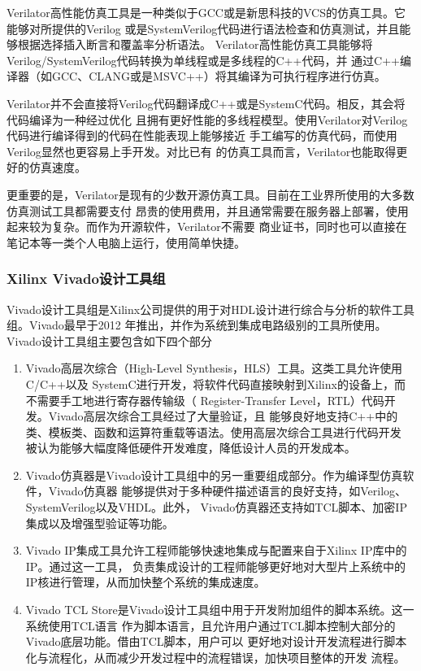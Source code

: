 Verilator高性能仿真工具是一种类似于GCC或是新思科技的VCS的仿真工具。它能够对所提供的Verilog
或是SystemVerilog代码进行语法检查和仿真测试，并且能够根据选择插入断言和覆盖率分析语法。
Verilator高性能仿真工具能够将Verilog/SystemVerilog代码转换为单线程或是多线程的C++代码，并
通过C++编译器（如GCC、CLANG或是MSVC++）将其编译为可执行程序进行仿真\cite{verilator_website}。

Verilator并不会直接将Verilog代码翻译成C++或是SystemC代码。相反，其会将代码编译为一种经过优化
且拥有更好性能的多线程模型。使用Verilator对Verilog代码进行编译得到的代码在性能表现上能够接近
手工编写的仿真代码\cite{snyder2017verilator}，而使用Verilog显然也更容易上手开发。对比已有
的仿真工具而言，Verilator也能取得更好的仿真速度\cite{snyder2013verilator}。

更重要的是，Verilator是现有的少数开源仿真工具。目前在工业界所使用的大多数仿真测试工具都需要支付
昂贵的使用费用，并且通常需要在服务器上部署，使用起来较为复杂。而作为开源软件，Verilator不需要
商业证书，同时也可以直接在笔记本等一类个人电脑上运行，使用简单快捷。

\subsubsection{Xilinx Vivado设计工具组}

Vivado设计工具组是Xilinx公司提供的用于对HDL设计进行综合与分析的软件工具组。Vivado最早于2012
年推出，并作为系统到集成电路级别的工具所使用。Vivado设计工具组主要包含如下四个部分

\begin{enumerate}
  \item Vivado高层次综合（High-Level Synthesis，HLS）工具。这类工具允许使用C/C++以及
        SystemC进行开发，将软件代码直接映射到Xilinx的设备上，而不需要手工地进行寄存器传输级（
        Register-Transfer Level，RTL）代码开发。Vivado高层次综合工具经过了大量验证，且
        能够良好地支持C++中的类、模板类、函数和运算符重载等语法。使用高层次综合工具进行代码开发
        被认为能够大幅度降低硬件开发难度，降低设计人员的开发成本。
  \item Vivado仿真器是Vivado设计工具组中的另一重要组成部分。作为编译型仿真软件，Vivado仿真器
        能够提供对于多种硬件描述语言的良好支持，如Verilog、SystemVerilog以及VHDL。此外，
        Vivado仿真器还支持如TCL脚本、加密IP集成以及增强型验证等功能。
  \item Vivado IP集成工具允许工程师能够快速地集成与配置来自于Xilinx IP库中的IP。通过这一工具，
        负责集成设计的工程师能够更好地对大型片上系统中的IP核进行管理，从而加快整个系统的集成速度。
  \item Vivado TCL Store是Vivado设计工具组中用于开发附加组件的脚本系统。这一系统使用TCL语言
        作为脚本语言，且允许用户通过TCL脚本控制大部分的Vivado底层功能。借由TCL脚本，用户可以
        更好地对设计开发流程进行脚本化与流程化，从而减少开发过程中的流程错误，加快项目整体的开发
        流程。
\end{enumerate}


